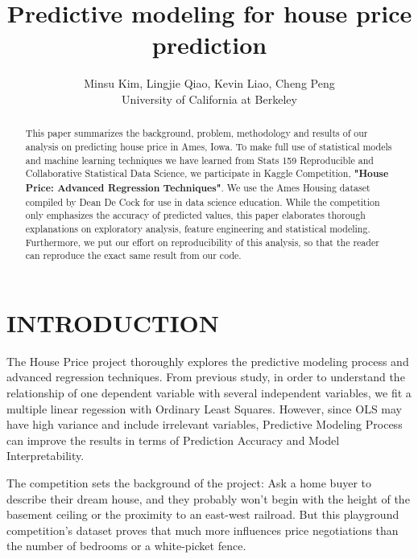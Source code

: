 \documentclass[letterpaper, 10 pt, conference]{ieeeconf}\usepackage[]{graphicx}\usepackage[]{color}
\title{\LARGE \bf
Predictive modeling for house price prediction
}
\author{Minsu Kim, Lingjie Qiao, Kevin Liao, Cheng Peng \\
University of California at Berkeley} %
\begin{document}
\maketitle
\thispagestyle{empty}
\pagestyle{empty}


\begin{abstract}

This paper summarizes the background, problem, methodology and results of our analysis on predicting house price in Ames, Iowa. To make full use of statistical models and machine learning techniques we have learned from Stats 159 Reproducible and Collaborative Statistical Data Science, we participate in Kaggle Competition, \textbf{"House Price: Advanced Regression Techniques"}. We use the Ames Housing dataset compiled by Dean De Cock for use in data science education. While the competition only emphasizes the accuracy of predicted values, this paper elaborates thorough explanations on exploratory analysis, feature engineering and statistical modeling. Furthermore, we put our effort on reproducibility of this analysis, so that the reader can reproduce the exact same result from our code.

\end{abstract}


\section{INTRODUCTION}

The House Price project thoroughly explores the predictive modeling process and advanced regression techniques. From previous study, in order to understand the relationship of one dependent variable with several independent variables, we fit a multiple linear regession with Ordinary Least Squares. However, since OLS may have high variance and include irrelevant variables, Predictive Modeling Process can improve the results in terms of Prediction Accuracy and Model Interpretability.

The competition sets the background of the project: Ask a home buyer to describe their dream house, and they probably won't begin with the height of the basement ceiling or the proximity to an east-west railroad. But this playground competition's dataset proves that much more influences price negotiations than the number of bedrooms or a white-picket fence. 
\end{document}
